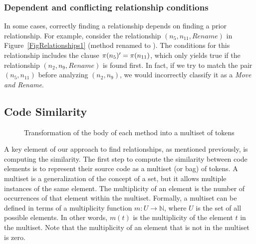\subsubsection{Dependent and conflicting relationship conditions}
\label{SecDependentConflictingRel}

In some cases, correctly finding a relationship depends on finding a prior relationship.
For example, consider the relationship $(n_5, n_{11}, Rename)$ in Figure~\ref{FigRelationships1} (method  renamed to ).
The conditions for this relationship includes the clause $\operatorname{\pi}(n_5)' = \operatorname{\pi}(n_{11})$, which only yields true if the relationship $(n_2, n_9, \mathit{Rename})$ is found first.
In fact, if we try to match the pair $(n_5, n_{11})$ before analyzing $(n_2, n_9)$, we would incorrectly classify it as a \textit{Move and Rename}.



\subsection{Code Similarity}
\label{SecCodeSim}

\begin{figure}[htb]
\renewcommand{\arraystretch}{1.3}
\centering
\footnotesize

\caption{Transformation of the body of each method into a multiset of tokens}
\label{FigSourceCodeTransformation}
\end{figure}

A key element of our approach to find relationships, as mentioned previously, is computing the similarity.
The first step to compute the similarity between code elements is to represent their source code as a multiset (or bag) of tokens.
A multiset is a generalization of the concept of a set, but it allows multiple instances of the same element.
The multiplicity of an element is the number of occurrences of that element within the multiset. Formally, a multiset can be defined in terms of a multiplicity function $m: U \to \mathbb{N}$, where $U$ is the set of all possible elements. In other words, $m(t)$ is the multiplicity of the element $t$ in the multiset. Note that the multiplicity of an element that is not in the multiset is zero.

